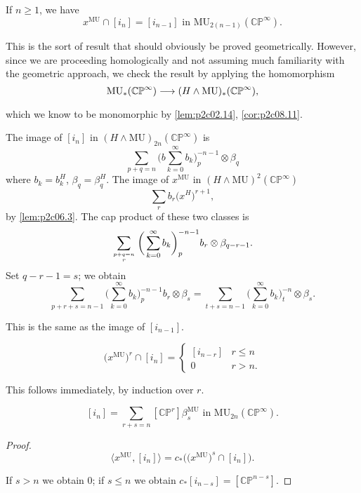 \documentclass[../main]{subfiles}
\begin{document}
\begin{lemma}
\label{lem:ch210.3}
If $n \ge 1$, we have \[x^{\mathrm{MU}} \cap [i_n] = [i_{n - 1}] \text { in } \mathrm{MU}_{2(n - 1)} (\mathbb {CP}^\infty).\]
\end{lemma}

This is the sort of result that should obviously be proved geometrically. However, since we are proceeding homologically and not assuming much familiarity with the geometric approach, we check the result by applying the homomorphism \[\mathrm{MU}_\ast (\mathbb {CP}^\infty) \lar{} (H \wedge \mathrm{MU})_\ast (\mathbb {CP}^\infty),\] which we know to be monomorphic by \ref{lem:p2c02.14}, \ref{cor:p2c08.11}. 

The image of $[i_n]$ in $(H \wedge \mathrm{MU})_{2n} (\mathbb {CP}^\infty)$ is \[\sum_{p + q = n} \bigg(b\sum_{k = 0}^\infty b_k\bigg)_p^{-n - 1} \otimes \beta_q\] where $b_k = b_k^H$, $\beta_q = \beta_q^H$. The image of $x^{\mathrm{MU}}$ in $(H \wedge \mathrm{MU})^2(\mathbb {CP}^\infty)$ \[\sum_r b_r \big(x^H\big)^{r + 1},\] by \eqref{lem:p2c06.3}. The cap product of these two classes is \[\sum_{{p + q = n} \atop r} \bigg(\sum_{k = 0}^\infty b_k\bigg)_p^{-n - 1} b_r \otimes \beta_{q - r - 1}.\] Set $q - r - 1 = s$; we obtain \[\sum_{p + r + s = n - 1} \bigg(\sum_{k = 0}^\infty b_k\bigg)_p^{-n - 1} b_r \otimes \beta_s = \sum_{t + s = n - 1} \bigg(\sum_{k = 0}^\infty b_k\bigg)_t^{-n} \otimes \beta_s.\]

This is the same as the image of $[i_{n - 1}]$. 

\begin{corollary}
\label{cor:p2c10.4}
\[\big(x^{\mathrm{MU}}\big)^r \cap [i_n] = \begin{cases}[i_{n - r}] & r \le n \\ 0 & r > n.\end{cases}\]
\end{corollary}

This follows immediately, by induction over $r$. 

\begin{corollary}
\label{cor:p2c10.5}
\[[i_n] = \sum_{r + s = n} [\mathbb {CP}^r] \beta_s^{\mathrm{MU}} \text { in } \mathrm {MU}_{2n} (\mathbb {CP}^\infty).\]
\end{corollary}
\begin{proof}
\[\big\langle x^{\mathrm{MU}}, [i_n]\big\rangle = c_\ast \big(\big(x^{\mathrm {MU}}\big)^s \cap [i_n]\big).\]

If $s > n$ we obtain $0$; if $s \le n$ we obtain $c_\ast[i_{n - s}] = [\mathbb {CP}^{n - s}]$.
\end{proof}
\end{document}
